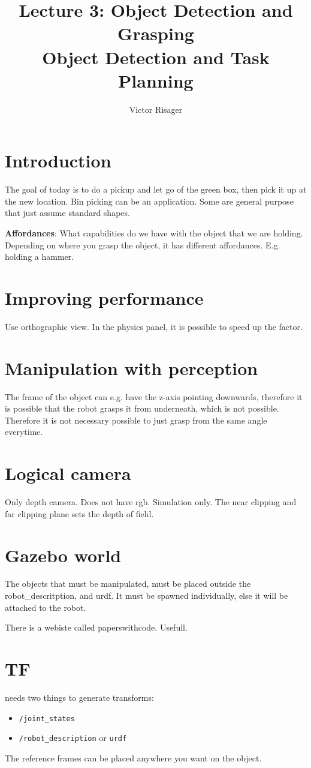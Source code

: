 \documentclass[a4paper]{article}
\title{Lecture 3: Object Detection and Grasping  \\
	\large Object Detection and Task Planning}
\author{Victor Risager}
\begin{document}
\maketitle

\section{Introduction}
The goal of today is to do a pickup and let go of the green box, then pick it up at the new location. Bin picking can be an application. Some are general purpose that just assume standard shapes. 

\textbf{Affordances}: What capabilities do we have with the object that we are holding. Depending on where you grasp the object, it has different affordances. E.g. holding a hammer. 

\section{Improving performance}
Use orthographic view. In the physics panel, it is possible to speed up the factor. 

\section{Manipulation with perception}
The frame of the object can e.g. have the z-axis pointing downwards, therefore it is possible that the robot grasps it from underneath, which is not possible. Therefore it is not necessary possible to just grasp from the same angle everytime. 

\section{Logical camera}
Only depth camera. Does not have rgb. Simulation only. The near clipping and far clipping plane sets the depth of field. 

\section{Gazebo world}
The objects that must be manipulated, must be placed outside the robot\_descritption, and urdf. It must be spawned individually, else it will be attached to the robot. 

There is a webiste called paperswithcode. Usefull. 

\section{TF}
needs two things to generate transforms:
\begin{itemize}
	\item \texttt{/joint\_states} 
	\item \texttt{/robot\_description} or \texttt{urdf}  
\end{itemize}

The reference frames can be placed anywhere you want on the object. 
 
\end{document}
